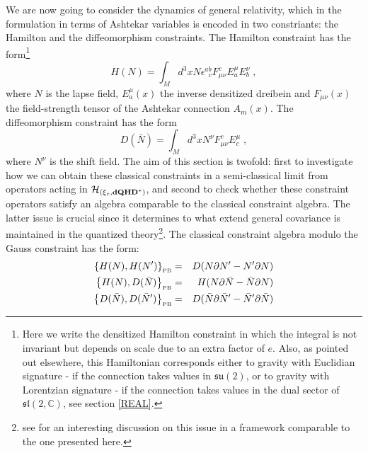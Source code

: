 \documentclass[12pt]{article}
\def\e{\epsilon}
\def\m{\mu}
\def\n{\nu}
\def\ch{{\cal H}}
\newcommand{\pa}{\partial}
\begin{document}
We are now going to consider the dynamics of general relativity, which in the formulation in terms of Ashtekar variables is encoded in two constriants: the Hamilton and the diffeomorphism constraints. The Hamilton constraint has the form\footnote{Here we write the densitized Hamilton constraint \cite{Ashtekar:1986yd} in which the integral is not invariant but depends on scale due to an extra factor of $e$. Also, as pointed out elsewhere, this Hamiltonian corresponds either to gravity with Euclidian signature - if the connection takes values in $\mathfrak{su}(2)$, or to gravity with Lorentzian signature - if the connection takes values in the dual sector of $\mathfrak{sl}(2,\mathbb{C})$, see section \ref{REAL}. }
\begin{equation}
H(N)= \int_M d^3x N 
  \e^{ab}_{\;\;c} F^c_{\m\n} E^\m_a E^\n_b \;,
\label{DYBB�L}
\end{equation}
where 
%
$N$ is the lapse field, $E_a^\m(x)$ the inverse densitized dreibein and $F_{\m\n}(x)$ the field-strength tensor of the Ashtekar connection $A_m(x)$.
The diffeomorphism constraint has the form 
\begin{equation}
D(\bar{N})= \int_M d^3x   N^\n
 F^c_{\m\n} E^\m_c \;,
\label{DYBB�L2}
\end{equation}
where $N^\n$ is the shift field. %
The aim of this section is twofold: first to investigate how we can obtain these classical constraints in a semi-classical limit from operators acting in $\ch_{(\xi_c,\mathbf{dQHD}^*)}$, and second to check whether these constraint operators satisfy an algebra comparable to the classical constraint algebra. The latter issue is crucial since it determines to what extend general covariance is maintained in the quantized theory\footnote{see \cite{Nicolai:2005mc} for an interesting discussion on this issue in a framework comparable to the one presented here.}. The classical constraint algebra modulo the Gauss constraint has the form:
\begin{eqnarray}
\left\{  H(N), H(N') \right\}_{\mbox{\tiny PB}} &=& D(N\pa N' - N'\pa N)
\label{one}\\
\left\{ H(N),D(\bar{N})  \right\}_{\mbox{\tiny PB}} &=& H( N \pa \bar{N} -  \bar{N} \pa N)
\label{two}\\
\left\{ D(\bar{N}),D(\bar{N}')  \right\}_{\mbox{\tiny PB}} &=& D(\bar{N}\pa \bar{N}'  - \bar{N}'\pa \bar{N}  )
\label{three}
\end{eqnarray}
\end{document}
